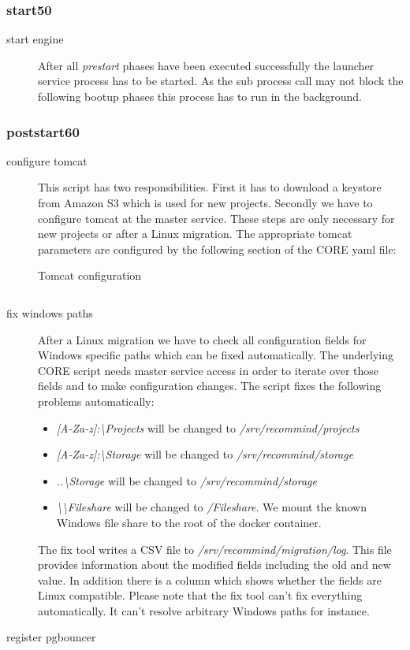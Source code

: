 			\subsubsection{start50}
			\begin{description}
				\item[start engine] After all \emph{prestart} phases have been executed successfully the launcher service process has to be started. As the sub process call may not block the following bootup phases this process has to run in the background.
			\end{description}
			\subsubsection{poststart60}
			\begin{description}
				\item[configure tomcat] This script has two responsibilities. First it has to download a keystore from Amazon S3 which is used for new projects. Secondly we have to configure tomcat at the master service. These steps are only necessary for new projects or after a Linux migration. The appropriate tomcat parameters are configured by the following section of the CORE yaml file:
				
				\begin{listing}[H]
					\caption{Tomcat configuration}
					\label{lst:p01:ch02:core_tomcat_desc}
					\inputminted{yaml}{\relative{chapter_02/section_3.2/tomcat_example.yaml}}
				\end{listing}
				\item[fix windows paths] After a Linux migration we have to check all configuration fields for Windows specific paths which can be fixed automatically. The underlying CORE script needs master service access in order to iterate over those fields and to make configuration changes. The script fixes the following problems automatically:
				\begin{itemize}
					\item \emph{[A-Za-z]:\textbackslash Projects} will be changed to \emph{/srv/recommind/projects}
					\item \emph{[A-Za-z]:\textbackslash Storage} will be changed to \emph{/srv/recommind/storage}
					\item \emph{..\textbackslash Storage} will be changed to \emph{/srv/recommind/storage}
					\item \emph{\textbackslash \textbackslash Fileshare} will be changed to \emph{/Fileshare}. We mount the known Windows file share to the root of the docker container.
				\end{itemize}
					
					The fix tool writes a CSV file to \emph{/srv/recommind/migration/log}. This file provides information about the modified fields including the old and new value. In addition there is a column which shows whether the fields are Linux compatible. Please note that the fix tool can't fix everything automatically. It can't resolve arbitrary Windows paths for instance.
				\item[register pgbouncer]
			\end{description}
